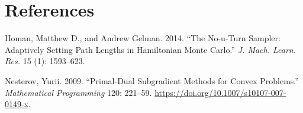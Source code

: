 \documentclass[
  12pt,
]{article}
\newlength{\cslhangindent}
\newlength{\cslentryspacingunit} %
\newenvironment{CSLReferences}[2] %
 {%
  \setlength{\parindent}{0pt}
  \ifodd #1
  \let\oldpar\par
  \def\par{\hangindent=\cslhangindent\oldpar}
  \fi
  \setlength{\parskip}{#2\cslentryspacingunit}
 }%
 {}
\begin{document}
\hypertarget{references}{%
\section*{References}\label{references}}

\hypertarget{refs}{}
\begin{CSLReferences}{1}{0}
\leavevmode{}%
Homan, Matthew D., and Andrew Gelman. 2014. {``The No-u-Turn Sampler:
Adaptively Setting Path Lengths in Hamiltonian Monte Carlo.''} \emph{J.
Mach. Learn. Res.} 15 (1): 1593--623.

\leavevmode{}%
Nesterov, Yurii. 2009. {``Primal-Dual Subgradient Methods for Convex
Problems.''} \emph{Mathematical Programming} 120: 221--59.
\url{https://doi.org/10.1007/s10107-007-0149-x}.

\end{CSLReferences}
\end{document}
